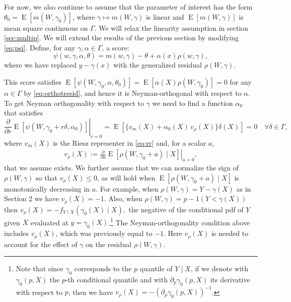 \documentclass[aos]{imsart}
\numberwithin{equation}{section}
\theoremstyle{plain}
\theoremstyle{remark}
\DeclareMathOperator{\E}{E}
\begin{document}
For now, we also continue to assume that the parameter of interest has the form $\theta_{0} = \E[m(W,\gamma_{0})]$, where $\gamma\mapsto m(W,\gamma)$ is linear and $\E[m(W,\gamma)]$ is mean square continuous on $\Gamma$. We will relax the linearity assumption in section \ref{sec:multip}. We will extend the results of the previous section by modifying \eqref{eq:psi}. Define, for any $\gamma, \alpha \in \Gamma$, a score:
\begin{equation}
\psi(w,\gamma,\alpha,\theta)=m(w,\gamma)-\theta+\alpha(x)\rho(w,\gamma), \label{eq:orthmomgenreg}
\end{equation}
where we have replaced $y - \gamma(x)$ with the generalized residual $\rho(W,\gamma)$. 

This score satisfies $\E[\psi(W, \gamma_0, \alpha, \theta_0)] = \E[\alpha(X) \rho(W, \gamma_0)] = 0$ for any $\alpha \in \Gamma$ by \eqref{eq:orthotresid}, and hence it is Neyman-orthogonal with respect to $\alpha$. To get Neyman orthogonality with respect to $\gamma$ we need to find a function $\alpha_0$ that satisfies 
\begin{equation}
    \left. \frac{\partial}{\partial r} \E[\psi(W, \gamma_0 + r\delta, \alpha_0)] \right|_{r = 0} = \E[\{v_m(X) + \alpha_0(X)\,v_{\rho}(X)\}\delta(X)] = 0 \quad \forall \delta \in \Gamma, \label{eq:orthogeneralized}
\end{equation}
where $v_m(X)$ is the Riesz representer in \eqref{eq:rr} and, for a scalar $a$,
\begin{align*}
v_\rho(X) := \left. \frac{\partial}{\partial a} \E[ \rho(W, \gamma_0 + a) \mid X] \right|_{a=0},
\end{align*}
that we assume exists. 
We further assume that we can normalize the sign of $\rho(W,\gamma)$ so that $v_{\rho}(X)\leq0$, as will
hold when $\E[\rho(W, \gamma_{0} + a) \mid X]$ is monotonically decreasing in $a$.  For example, when $\rho(W,\gamma)=Y-\gamma(X)$ as in Section 2 we have $v_{\rho}(X)=-1$. Also, when $\rho(W,\gamma)=p-1(Y<\gamma(X))$ then $v_{\rho}(X)=-f_{Y\mid X}%
(\gamma_{0}(X)\mid X),$ the negative of the conditional pdf of $Y$ given $X$
evaluated at $y=\gamma_{0}(X)$.\footnote{Note that since $\gamma_0$ corresponds to the $p$ quantile of $Y\mid X$, if we denote with $\gamma_0(p, X)$ the $p$-th conditional quantile and with $\partial_p\gamma_0(p, X)$ its derivative with respect to $p$, then we have $v_\rho(X) = - (\partial_p\gamma_0(p, X))^{-1}$.}
The Neyman-orthogonality condition above includes $v_\rho(X)$, which was previously equal to $-1$.
Here $v_\rho(X)$ is needed to account for the effect of $\gamma$ on the residual  $\rho(W,\gamma)$.
\end{document}
